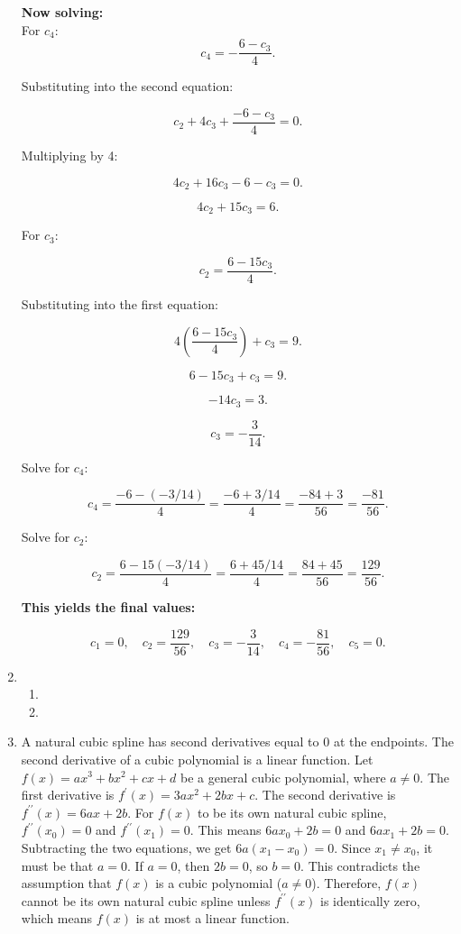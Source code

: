 \documentclass[12pt]{article}
\begin{document}
\begin{enumerate}[leftmargin=2em]
\textbf{Now solving:}\\

For \( c_4 \):
\[
c_4 = -\frac{6 - c_3}{4}.
\]

Substituting into the second equation:

\[
c_2 + 4c_3 + \frac{-6 - c_3}{4} = 0.
\]

Multiplying by 4:

\[
4c_2 + 16c_3 - 6 - c_3 = 0.
\]

\[
4c_2 + 15c_3 = 6.
\]

For \( c_3 \):

\[
c_2 = \frac{6 - 15c_3}{4}.
\]

Substituting into the first equation:

\[
4\left(\frac{6 - 15c_3}{4}\right) + c_3 = 9.
\]

\[
6 - 15c_3 + c_3 = 9.
\]

\[
-14c_3 = 3.
\]

\[
c_3 = -\frac{3}{14}.
\]

Solve for \( c_4 \):

\[
c_4 = \frac{-6 - (-3/14)}{4} = \frac{-6 + 3/14}{4} = \frac{-84 + 3}{56} = \frac{-81}{56}.
\]

Solve for \( c_2 \):

\[
c_2 = \frac{6 - 15(-3/14)}{4} = \frac{6 + 45/14}{4} = \frac{84 + 45}{56} = \frac{129}{56}.
\]

\textbf{This yields the final values:}

\[
c_1 = 0, \quad c_2 = \frac{129}{56}, \quad c_3 = -\frac{3}{14}, \quad c_4 = -\frac{81}{56}, \quad c_5 = 0.
\]

    \item
    \begin{enumerate}
        \item
        \item
    \end{enumerate}

    \item
    \begin{enumerate}
        A natural cubic spline has second derivatives equal to \(0\) at the endpoints. The second derivative of a cubic 
        polynomial is a linear function. Let \(f(x)=ax^{3}+bx^{2}+cx+d\) be a general cubic polynomial, where \(a\ne 0\). 
        The first derivative is \(f^{\prime }(x)=3ax^{2}+2bx+c\). The second derivative is \(f^{\prime \prime }
        (x)=6ax+2b\). For \(f(x)\) to be its own natural cubic spline, \(f^{\prime \prime }(x_{0})=0\) and 
        \(f^{\prime\prime }(x_{1})=0\). This means \(6ax_{0}+2b=0\) and \(6ax_{1}+2b=0\). Subtracting the two equations, we 
        get \(6a(x_{1}-x_{0})=0\). Since \(x_{1}\ne x_{0}\), it must be that \(a=0\). If \(a=0\), then \(2b=0\), so 
        \(b=0\). This contradicts the assumption that \(f(x)\) is a cubic polynomial (\(a\ne 0\)). Therefore, \(f(x)\) 
        cannot be its own natural cubic spline unless \(f^{\prime \prime }(x)\) is identically zero, which means \(f(x)\) 
        is at most a linear function.
    \end{enumerate}
    

\end{enumerate}
\end{document}
